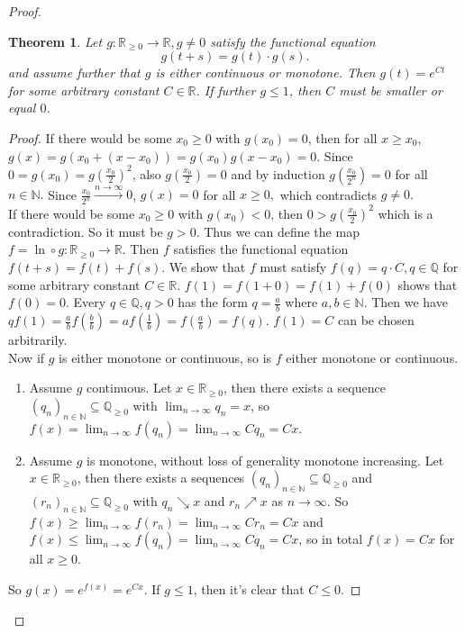 \documentclass[12pt,a4paper]{scrartcl}
\newtheorem{theorem}{Theorem}[section]
\numberwithin{equation}{section}
\newcommand{\R}{\mathbb{R}} %
\newcommand{\Q}{\mathbb{Q}} %
\newcommand{\N}{\mathbb{N}} %
\begin{document}
\begin{proof}
\begin{theorem} \label{th:excauchyfunceq}
Let $g:\R_{\geq 0} \to \R, g \neq 0$ satisfy the functional equation
\begin{equation}
g\left(t+s\right) = g\left(t\right) \cdot g\left(s\right).
\end{equation} 
and assume further that $g$ is either continuous or monotone.
Then $g\left(t\right) = e^{Ct}$ for some arbitrary constant $C \in \R$. If further $g \leq 1$, then $C$ must be smaller or equal $0$.
\end{theorem}
\begin{proof}
If there would be some $x_0 \geq 0$ with $g\left(x_0\right) = 0$, then for all $x \geq x_0$, $g\left(x\right) = g\left(x_0 + \left(x - x_0\right)\right) = g\left(x_0\right) g\left(x-x_0\right) = 0.$ Since $0 = g\left(x_0\right) = g\left(\frac{x_0}{2}\right)^2$, also $g\left(\frac{x_0}{2}\right) = 0$ and by induction $g\left(\frac{x_0}{2^n}\right) = 0$ for all $n \in \N.$ Since $\frac{x_0}{2^n} \overset{n \to \infty}{\to} 0$, $g\left(x\right) = 0$ for all $x \geq 0,$ which contradicts $g \neq 0.$\\
If there would be some $x_0 \geq 0$ with $g\left(x_0\right) < 0$, then $0 > g\left(\frac{x_0}{2}\right)^2$ which is a contradiction. So it must be $g > 0.$
Thus we can define the map $ f = \ln \circ g:\R_{\geq 0} \to \R $. Then $f$ satisfies the functional equation $f\left(t+s\right) = f\left(t\right) + f\left(s\right).$
We show that $f$ must satisfy $f\left(q\right) = q \cdot C , q \in \Q$ for some arbitrary constant $C \in \R$.
$f\left(1\right) = f\left(1+0\right) = f\left(1\right) + f\left(0\right)$ shows that $f\left(0\right) = 0.$
Every $q \in \Q, q > 0$ has the form $q = \frac{a}{b}$ where $a,b \in \N.$ Then we have $q f\left(1\right) = \frac{a}{b} f\left(\frac{b}{b}\right) = a f\left(\frac{1}{b}\right) = f\left(\frac{a}{b}\right) = f\left(q\right).$
$f\left(1\right) = C$ can be chosen arbitrarily. \\
Now if $g$ is either monotone or continuous, so is $f$ either monotone or continuous.
\begin{enumerate}
\item Assume $g$ continuous. Let $x \in \R_{\geq 0}$, then there exists a sequence $\left(q_n\right)_{n \in \N} \subseteq \Q_{\geq 0}$ with $\lim_{n \to \infty} q_n = x$, so $f\left(x\right) = \lim_{n \to \infty} f\left(q_n\right) = \lim_{n \to \infty} C q_n = Cx.$
\item Assume $g$ is monotone, without loss of generality monotone increasing. Let  $x \in \R_{\geq 0}$, then there exists a sequences $\left(q_n\right)_{n \in \N} \subseteq \Q_{\geq 0}$ and $\left(r_n\right)_{n \in \N} \subseteq \Q_{\geq 0}$ with $ q_n \searrow x$ and $r_n\nearrow x$ as $n \to \infty.$ So $f\left(x\right) \geq \lim_{n \to \infty} f\left(r_n\right) = \lim_{n \to \infty} C r_n = C x$ and $f\left(x\right) \leq \lim_{n \to \infty} f\left(q_n\right) = \lim_{n \to \infty} C q_n = C x$, so in total $f\left(x\right) = C x$ for all $ x \geq 0.$
\end{enumerate}
So $g\left(x\right) = e^{f\left(x\right)} = e^{Cx}.$
If $g \leq 1$, then it's clear that $C \leq 0.$
  

\end{proof}
\end{proof}
\end{document}
